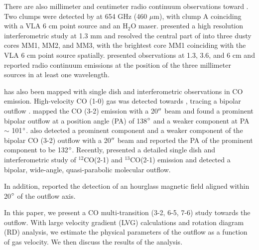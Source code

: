 There are also millimeter and centimeter radio continuum observations toward . Two clumps were detected by \citet{2007ApJ...654L..87C} at 654 GHz (460 $\mu$m), with clump A coinciding with a VLA 6 cm point source \citep{1993AJ....105.1495H} and an H$_2$O maser. \citet{2009ApJ...696...66Q} presented a high resolution interferometric study at 1.3 mm and resolved the central part of  into three dusty cores MM1, MM2, and MM3, with the brightest core MM1 coinciding with the VLA 6 cm point source spatially. \citet{2011AJ....142..147T} presented observations at 1.3, 3.6, and 6 cm and reported radio continuum emissions at the position of the three millimeter sources in at least one wavelength.

 has also been mapped with single dish and interferometric observations in CO emission. High-velocity CO (1-0) gas was detected towards  \citep{1991AJ....101.1435M,1996ApJ...457..267S}, tracing a bipolar outflow \citep{1996ApJ...457..267S}. \citet{1997PhDT........21H} mapped the CO (3-2) emission with a 20${\mbox{$^{\prime\prime}$}}$ beam and found a prominent bipolar outflow at a position angle (PA) of 138${\mbox{$^\circ$}}$ and a weaker component at PA $\sim$ 101${\mbox{$^\circ$}}$. \citet{2003A&A...412..175K} also detected a prominent component and a weaker component of the bipolar CO (3-2) outflow with a 20${\mbox{$^{\prime\prime}$}}$ beam and reported the PA of the prominent component to be 132${\mbox{$^\circ$}}$. Recently, \citet{2009ApJ...696...66Q} presented a detailed single dish and interferometric study of $^{12}$CO(2-1) and $^{13}$CO(2-1) emission and detected a bipolar, wide-angle, quasi-parabolic molecular outflow. 

In addition, \citet{2014ApJ...794L..18Q} reported the detection of an hourglass magnetic field aligned within 20${\mbox{$^\circ$}}$ of the outflow axis.

In this paper, we present a CO multi-transition (3-2, 6-5, 7-6) study towards the  outflow. With large velocity gradient (LVG) calculations and rotation diagram (RD) analysis, we estimate the physical parameters of the outflow as a function of gas velocity. We then discuss the results of the analysis.


